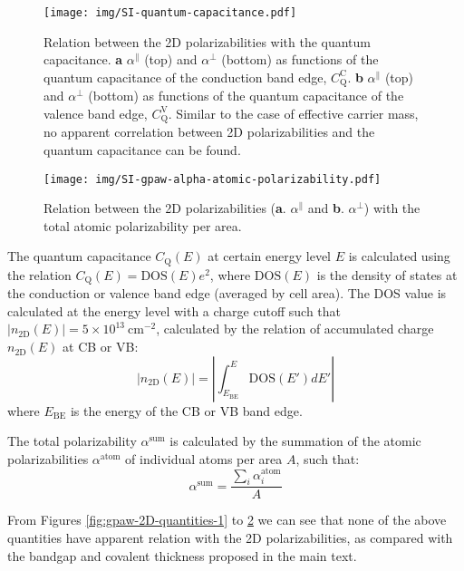 \documentclass[manuscript=suppinfo,email=true,hyperref=true,keywords=false]{achemso}
\begin{document}
\begin{figure}[htbp]
  \centering
  \texttt{[image: img/SI-quantum-capacitance.pdf]}
  \caption{Relation between the 2D polarizabilities with the quantum
    capacitance. \textbf{a} $\alpha^{\parallel}$ (top) and
    $\alpha^{\perp}$ (bottom) as functions of the quantum capacitance
    of the conduction band edge,
    $C_{\mathrm{Q}}^{\mathrm{C}}$. \textbf{b} $\alpha^{\parallel}$
    (top) and $\alpha^{\perp}$ (bottom) as functions of the quantum
    capacitance of the valence band edge,
    $C_{\mathrm{Q}}^{\mathrm{V}}$. Similar to the case of effective
    carrier mass, no apparent correlation between 2D polarizabilities
    and the quantum capacitance can be found.}
  \label{fig:gpaw-2D-quantities-2}
\end{figure}

\begin{figure}[htbp]
  \centering
  \texttt{[image: img/SI-gpaw-alpha-atomic-polarizability.pdf]}
  \caption{Relation between the 2D polarizabilities
    (\textbf{a}. $\alpha^{\parallel}$ and
    \textbf{b}. $\alpha^{\perp}$) with the total atomic polarizability per area.}
  \label{fig:gpaw-2D-quantities-3}
\end{figure}

The quantum capacitance
$C_{\mathrm{Q}}(E)$ at certain energy level $E$ is calculated using
the relation $C_{\mathrm{Q}}(E)=\mathrm{DOS}(E)e^{2}$, where
$\mathrm{DOS}(E)$ is the density of states at the conduction or valence band edge (averaged by cell
area). The DOS value is calculated at the energy level with a charge
cutoff such that
$|n_{\mathrm{2D}}(E)| = 5 \times 10^{13}\ \mathrm{cm}^{-2}$, calculated by
the relation of accumulated charge $n_{\mathrm{2D}}(E)$ at CB or VB:
\begin{equation}
  \label{eq:CQ-method}
  |n_{\mathrm{2D}}(E)| = \left|\int_{E_{\mathrm{BE}}}^{E} \mathrm{DOS}(E') dE' \right|
\end{equation}
where $E_{\mathrm{BE}}$ is the energy of the CB or VB band edge.

The total polarizability $\alpha^{\mathrm{sum}}$ is calculated by the
summation of the atomic polarizabilities $\alpha^{\mathrm{atom}}$
\cite{Gould_2016_jctc} of individual atoms per area $A$, such that:
\begin{equation}
  \label{eq:atom-polar}
  \alpha^{\mathrm{sum}} = \frac{\sum_{i} \alpha^{\mathrm{atom}}_{i}}{A}
\end{equation}

From Figures \ref{fig:gpaw-2D-quantities-1} to
\ref{fig:gpaw-2D-quantities-3} we can see that none of the above
quantities have apparent relation with the 2D polarizabilities, as
compared with the bandgap and covalent thickness proposed in the main
text. 
\end{document}
